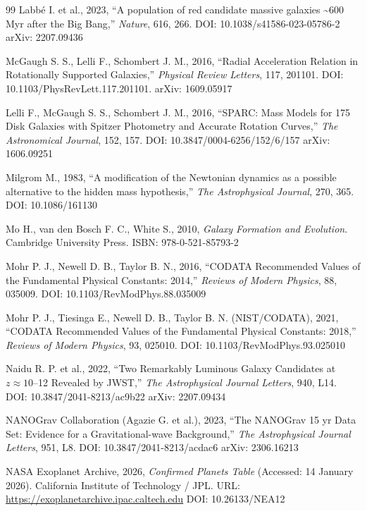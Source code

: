 \documentclass[11pt,a4paper]{article}
\begin{document}
{\begin{thebibliography}{99}
Labbé I. et al., 2023, ``A population of red candidate massive galaxies \textasciitilde600 Myr after the Big Bang,'' \emph{Nature}, 616, 266. DOI: 10.1038/s41586-023-05786-2 arXiv: 2207.09436

McGaugh S. S., Lelli F., Schombert J. M., 2016, ``Radial Acceleration Relation in Rotationally Supported Galaxies,'' \emph{Physical Review Letters}, 117, 201101. DOI: 10.1103/PhysRevLett.117.201101. arXiv: 1609.05917

Lelli F., McGaugh S. S., Schombert J. M., 2016, ``SPARC: Mass Models for 175 Disk Galaxies with Spitzer Photometry and Accurate Rotation Curves,'' \emph{The Astronomical Journal}, 152, 157. DOI: 10.3847/0004-6256/152/6/157 arXiv: 1606.09251

Milgrom M., 1983, ``A modification of the Newtonian dynamics as a possible alternative to the hidden mass hypothesis,'' \emph{The Astrophysical Journal}, 270, 365. DOI: 10.1086/161130

Mo H., van den Bosch F. C., White S., 2010, \emph{Galaxy Formation and Evolution}. Cambridge University Press. ISBN: 978-0-521-85793-2

Mohr P. J., Newell D. B., Taylor B. N., 2016, ``CODATA Recommended Values of the Fundamental Physical Constants: 2014,'' \emph{Reviews of Modern Physics}, 88, 035009. DOI: 10.1103/RevModPhys.88.035009

Mohr P. J., Tiesinga E., Newell D. B., Taylor B. N. (NIST/CODATA), 2021, ``CODATA Recommended Values of the Fundamental Physical Constants: 2018,'' \emph{Reviews of Modern Physics}, 93, 025010. DOI: 10.1103/RevModPhys.93.025010

Naidu R. P. et al., 2022, ``Two Remarkably Luminous Galaxy Candidates at \(z \approx 10\)--12 Revealed by JWST,'' \emph{The Astrophysical Journal Letters}, 940, L14. DOI: 10.3847/2041-8213/ac9b22 arXiv: 2207.09434

NANOGrav Collaboration (Agazie G. et al.), 2023, ``The NANOGrav 15 yr Data Set: Evidence for a Gravitational-wave Background,'' \emph{The Astrophysical Journal Letters}, 951, L8. DOI: 10.3847/2041-8213/acdac6 arXiv: 2306.16213

NASA Exoplanet Archive, 2026, \emph{Confirmed Planets Table} (Accessed: 14 January 2026). California Institute of Technology / JPL. URL: \url{https://exoplanetarchive.ipac.caltech.edu} DOI: 10.26133/NEA12


\end{thebibliography}}
\end{document}
